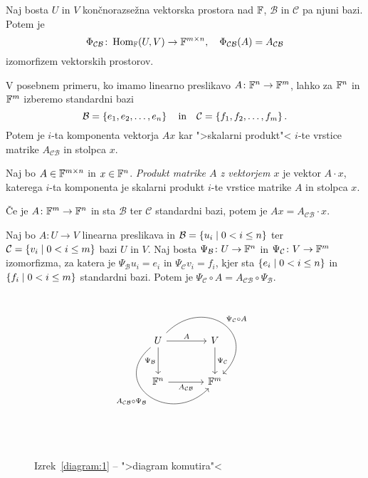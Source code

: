 \documentclass[12pt, a4paper]{article}
\begin{document}
\obvs

\begin{izrek}
Naj bosta $U$ in $V$ končnorazsežna vektorska prostora nad $\mathbb{F}$, $\mathcal{B}$ in $\mathcal{C}$ pa njuni bazi. Potem je
\[
\Phi_{\mathcal{CB}}\colon\operatorname{Hom}_{\mathbb{F}}(U,V)\to\mathbb{F}^{m\times n},\quad \Phi_{\mathcal{CB}}(A)=A_{\mathcal{CB}}
\]
izomorfizem vektorskih prostorov.
\end{izrek}

\obvs

V posebnem primeru, ko imamo linearno preslikavo $A\colon\mathbb{F}^n\to\mathbb{F}^m$, lahko za $\mathbb{F}^n$ in $\mathbb{F}^m$ izberemo standardni bazi
\[
\mathcal{B}=\left\{e_1,e_2,\dots,e_n\right\}
\quad\text{in}\quad
\mathcal{C}=\left\{f_1,f_2,\dots,f_m\right\}.
\]
Potem je $i$-ta komponenta vektorja $Ax$ kar ">skalarni produkt"< $i$-te vrstice matrike $A_{\mathcal{CB}}$ in stolpca $x$.

\begin{definicija}
Naj bo $A\in\mathbb{F}^{m\times n}$ in $x\in\mathbb{F}^n$. \emph{Produkt matrike $A$ z vektorjem $x$} je vektor $A\cdot x$, katerega $i$-ta komponenta je skalarni produkt $i$-te vrstice matrike $A$ in stolpca $x$.
\end{definicija}

\begin{opomba}
Če je $A\colon\mathbb{F}^m\to\mathbb{F}^n$ in sta $\mathcal{B}$ ter $\mathcal{C}$ standardni bazi, potem je $Ax=A_{\mathcal{CB}}\cdot x$.
\end{opomba}

\begin{izrek}\label{diagram:1}
Naj bo $A\colon U\to V$ linearna preslikava in $\mathcal{B}=\left\{u_i\mid 0<i\leq n\right\}$ ter $\mathcal{C}=\left\{v_i\mid 0<i\leq m\right\}$ bazi $U$ in $V$. Naj bosta $\Psi_{\mathcal{B}}\colon U\to\mathbb{F}^n$ in $\Psi_{\mathcal{C}}\colon V\to\mathbb{F}^m$ izomorfizma, za katera je $\Psi_{\mathcal{B}}u_i=e_i$ in $\Psi_{\mathcal{C}}v_i=f_i$, kjer sta $\left\{e_i\mid 0<i\leq n\right\}$ in $\left\{f_i\mid 0<i\leq m\right\}$ standardni bazi. Potem je $\Psi_{\mathcal{C}}\circ A=A_{\mathcal{CB}}\circ\Psi_{\mathcal{B}}$.
\end{izrek}

\begin{figure}[H]
\[
\begin{tikzcd}[column sep=large, row sep=large]
U
\arrow[r, "A"]
\arrow[d, "\Psi_{\mathcal{B}}"']
\arrow[dr, out=45, in=45, looseness=2, "\Psi_{\mathcal{C}}\circ A"]
\arrow[dr, out=220, in=225, looseness=2, "A_{\mathcal{CB}}\circ \Psi_{\mathcal{B}}"'] & V \arrow[d, "\Psi_{\mathcal{C}}"] \\
\F^n \arrow[r, "A_{\mathcal{CB}}"'] & \F^m
\end{tikzcd}
\]
\vspace{-50pt}\\
\caption{Izrek~\ref{diagram:1} -- ">diagram komutira"<}
\end{figure}
\end{document}
